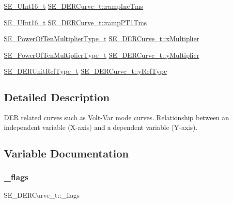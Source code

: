 \begin{DoxyCompactItemize}
\item 
\hyperlink{group__UInt16_gac68d541f189538bfd30cfaa712d20d29}{S\+E\+\_\+\+U\+Int16\+\_\+t} \hyperlink{group__DERCurve_ga93d46bb90365c6520360905b72b53cd8}{S\+E\+\_\+\+D\+E\+R\+Curve\+\_\+t\+::ramp\+Inc\+Tms}
\item 
\hyperlink{group__UInt16_gac68d541f189538bfd30cfaa712d20d29}{S\+E\+\_\+\+U\+Int16\+\_\+t} \hyperlink{group__DERCurve_gac3e2d656269ffc0cb1ba8e642f6893b4}{S\+E\+\_\+\+D\+E\+R\+Curve\+\_\+t\+::ramp\+P\+T1\+Tms}
\item 
\hyperlink{group__PowerOfTenMultiplierType_gaf0317b781dc8dbb9cb6ac4e44a14fdef}{S\+E\+\_\+\+Power\+Of\+Ten\+Multiplier\+Type\+\_\+t} \hyperlink{group__DERCurve_ga143077494db6c432ae52adafa1a3c825}{S\+E\+\_\+\+D\+E\+R\+Curve\+\_\+t\+::x\+Multiplier}
\item 
\hyperlink{group__PowerOfTenMultiplierType_gaf0317b781dc8dbb9cb6ac4e44a14fdef}{S\+E\+\_\+\+Power\+Of\+Ten\+Multiplier\+Type\+\_\+t} \hyperlink{group__DERCurve_gab40dc9af7884e95d4858f0876fda8c32}{S\+E\+\_\+\+D\+E\+R\+Curve\+\_\+t\+::y\+Multiplier}
\item 
\hyperlink{group__DERUnitRefType_gaff0b9dcda4cd888095dba6d262e5ce86}{S\+E\+\_\+\+D\+E\+R\+Unit\+Ref\+Type\+\_\+t} \hyperlink{group__DERCurve_gaae97cf9da99cb8f14adc1985986552e7}{S\+E\+\_\+\+D\+E\+R\+Curve\+\_\+t\+::y\+Ref\+Type}
\end{DoxyCompactItemize}


\subsection{Detailed Description}
D\+ER related curves such as Volt-\/\+Var mode curves. Relationship between an independent variable (X-\/axis) and a dependent variable (Y-\/axis). 

\subsection{Variable Documentation}
\mbox{\label{group__DERCurve_gaed4a71593a5f29f29c53fda240e616e4}} 
\subsubsection{\texorpdfstring{\+\_\+flags}{\_flags}}
{\footnotesize\ttfamily S\+E\+\_\+\+D\+E\+R\+Curve\+\_\+t\+::\+\_\+flags}

